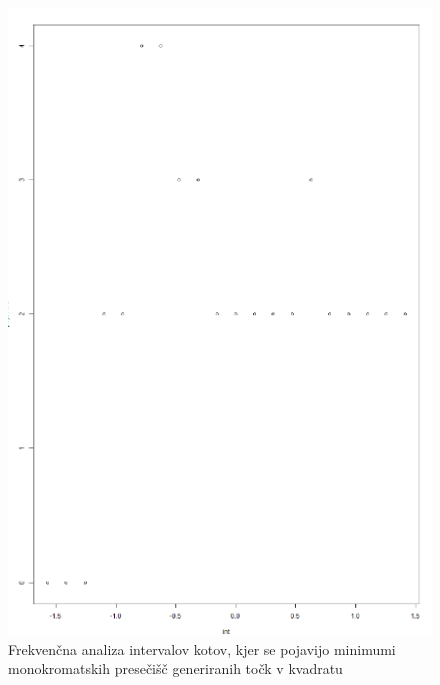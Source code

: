 \documentclass[12pt, a4paper]{article}
\begin{document}
	\begin{figure}[h!]
		\caption{Frekvenčna analiza intervalov kotov, kjer se pojavijo minimumi monokromatskih presečišč generiranih točk v kvadratu}
		\includegraphics[scale=0.6]{frekvencni}
		\centering
	\end{figure}
	
\end{document}
